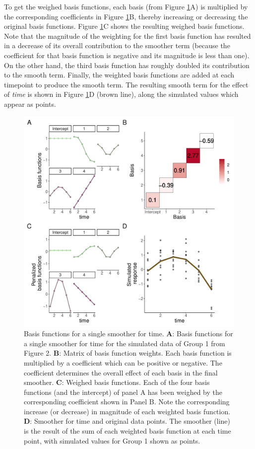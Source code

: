 \documentclass[
]{article}
\begin{document}
To get the weighed basis functions, each basis (from Figure \ref{fig:basis-plot}A) is multiplied by the corresponding coefficients in Figure \ref{fig:basis-plot}B, thereby increasing or decreasing the original basis functions. Figure \ref{fig:basis-plot}C shows the resulting weighed basis functions. Note that the magnitude of the weighting for the first basis function has resulted in a decrease of its overall contribution to the smoother term (because the coefficient for that basis function is negative and its magnitude is less than one). On the other hand, the third basis function has roughly doubled its contribution to the smooth term. Finally, the weighted basis functions are added at each timepoint to produce the smooth term. The resulting smooth term for the effect of \emph{time} is shown in Figure \ref{fig:basis-plot}D (brown line), along the simulated values which appear as points.



\begin{figure}

{\centering \includegraphics[width=0.75\linewidth]{Main_manuscript_files/figure-latex/basis-plot-1} 

}

\caption{Basis functions for a single smoother for time. \textbf{A}: Basis functions for a single smoother for time for the simulated data of Group 1 from Figure 2. \textbf{B}: Matrix of basis function weights. Each basis function is multiplied by a coefficient which can be positive or negative. The coefficient determines the overall effect of each basis in the final smoother. \textbf{C}: Weighed basis functions. Each of the four basis functions (and the intercept) of panel A has been weighed by the corresponding coefficient shown in Panel B. Note the corresponding increase (or decrease) in magnitude of each weighted basis function. \textbf{D}: Smoother for time and original data points. The smoother (line) is the result of the sum of each weighted basis function at each time point, with simulated values for Group 1 shown as points.}\label{fig:basis-plot}
\end{figure}
\end{document}
